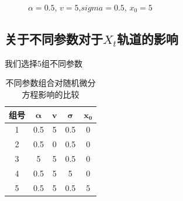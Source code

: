 \documentclass[12pt,a4paper]{article}
\begin{document}
\begin{figure}[t]
    \centering
\caption{$\alpha=0.5$, $v=5$,$sigma=0.5$, $x_0=5$}
\label{fig:EM5}
\end{figure}

\subsection{关于不同参数对于$X_t$轨道的影响}
我们选择5组不同参数
\begin{table}[h]
\centering
\begin{tabular}{|c|c|c|c|c|}
\hline
\textbf{组号} & $\boldsymbol{\alpha}$ & $\boldsymbol{v}$ & $\boldsymbol{\sigma}$ & $\boldsymbol{x_0}$ \\ 
\toprule
1             & 0.5                   & 5                & 0.5                   & 0                  \\ \hline
2             & 0.5                   & 0                & 0.5                   & 0                  \\ \hline
3             & 5                     & 5                & 0.5                   & 0                  \\ \hline
4             & 0.5                   & 5                & 5                     & 0                  \\ \hline
5             & 0.5                   & 5                & 0.5                   & 5                  \\ 
\bottomrule
\end{tabular}
\caption{不同参数组合对随机微分方程影响的比较}
\label{tab:parameter_sets}
\end{table}
\end{document}
